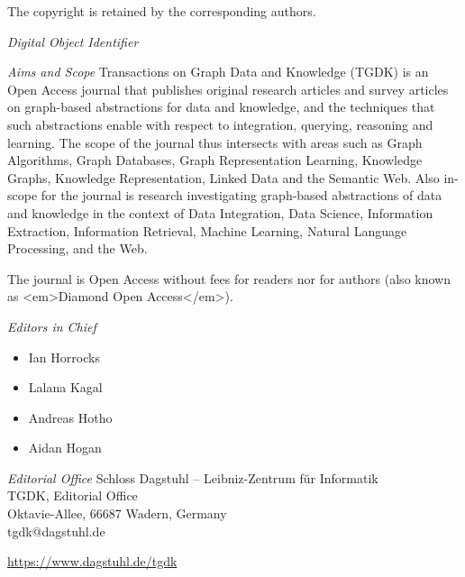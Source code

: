 \documentclass[a4paper,UKenglish]{tgdkmaster-v2021}
\begin{document}
\begin{publicationinfo}
The copyright is retained by the corresponding authors.

\vfill
\emph{Digital Object Identifier}\newline
\printIssueDOI

\newpage


\bigskip

\emph{Aims and Scope}\newline
Transactions on Graph Data and Knowledge (TGDK) is an Open Access journal that publishes original research articles and survey articles on graph-based abstractions for data and knowledge, and the techniques that such abstractions enable with respect to integration, querying, reasoning and learning. The scope of the journal thus intersects with areas such as Graph Algorithms, Graph Databases, Graph Representation Learning, Knowledge Graphs, Knowledge Representation, Linked Data and the Semantic Web. Also in-scope for the journal is research investigating graph-based abstractions of data and knowledge in the context of Data Integration, Data Science, Information Extraction, Information Retrieval, Machine Learning, Natural Language Processing, and the Web.

\medskip

The journal is Open Access without fees for readers nor for authors (also known as <em>Diamond Open Access</em>).	

\bigskip

\emph{Editors in Chief}
\begin{itemize}
\item Ian Horrocks %
\item Lalana Kagal %
\item Andreas Hotho %
\item Aidan Hogan %
\end{itemize}

\bigskip
\emph{Editorial Office}\newline
Schloss Dagstuhl -- Leibniz-Zentrum f\"ur Informatik\\
TGDK, Editorial Office\\
Oktavie-Allee, 66687 Wadern, Germany\\ 
tgdk@dagstuhl.de


\vfill

\url{https://www.dagstuhl.de/tgdk}
 
 \thispagestyle{empty}
 \onecolumn
\end{publicationinfo}
\end{document}
